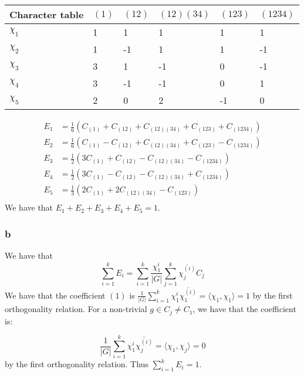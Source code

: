 \documentclass[]{article}
\begin{document}
\begin{table}[h!]
	\centering
	\begin{tabular}{|l|l|l|l|l|l|}
		\hline
		Character table & $(1)$ & $(12)$ & $(12)(34)$ & $(123)$ & $(1234)$ \\ \hline
		$\chi_1$        & 1     & 1      & 1          & 1       & 1        \\ \hline
		$\chi_2$        & 1     & -1     & 1          & 1       & -1       \\ \hline
		$\chi_3$        & 3     & 1      & -1         & 0       & -1       \\ \hline
		$\chi_4$        & 3     & -1     & -1         & 0       & 1        \\ \hline
		$\chi_5$        & 2     & 0      & 2          & -1      & 0        \\ \hline
	\end{tabular}
\end{table}
\begin{align*}
	E_1 &= \frac{1}{6}\left(C_{(1)} + C_{(12)} + C_{(12)(34)} + C_{(123)} + C_{(1234)}\right)\\
	E_2 &= \frac{1}{6}\left(C_{(1)} - C_{(12)} + C_{(12)(34)} + C_{(123)} - C_{(1234)}\right)\\
	E_3 &= \frac{1}{2}\left(3 C_{(1)} + C_{(12)} - C_{(12)(34)}  - C_{(1234)}\right)\\
	E_4 &= \frac{1}{2}\left(3 C_{(1)} - C_{(12)} - C_{(12)(34)}  + C_{(1234)}\right)\\
	E_5 &= \frac{1}{3}\left(2 C_{(1)} + 2 C_{(12)(34)}  - C_{(123)}\right)\\
\end{align*}
We have that $E_1 + E_2 + E_3 + E_4 + E_5 = 1$.
\subsubsection*{b}
We have that
\begin{equation}
	\sum_{i = 1}^k E_i = \sum_{i = 1}^k \frac{\chi^i_1}{|G|} \sum_{j = 1}^k \overline{\chi^{(i)}_j} C_j
\end{equation} 
We have that the coefficient $(1)$ is $\frac{1}{|G|} \sum_{i = 1}^k \chi_1^i \overline{\chi_1^{(i)}} = \langle \chi_1, \chi_1 \rangle = 1$ by the first orthogonality relation. For a non-trivial $g \in C_j \neq C_1$, we have that the coefficient is:

\begin{equation}
	\frac{1}{|G|} \sum_{i = 1}^k \chi_1^i \overline{\chi_j^{(i)}} = \langle \chi_1, \chi_j \rangle = 0
\end{equation}
by the first orthogonality relation.
Thus $\sum_{i = 1}^k E_i = 1$. 
\end{document}
